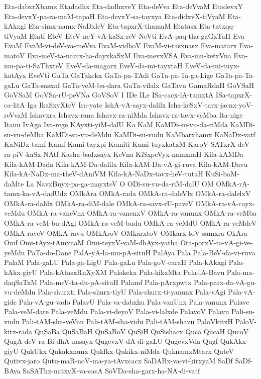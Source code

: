 {Eta-dabxrXbamx
Etadadhx
Eta-dadhxveY
Eta-deVva
Eta-deVvaM
EtadevxY
Eta-devxY-pa-ra-maM-tapaH
Eta-devxY-sa-tayxya
Eta-didxvX-tiVyaM
Eta-kAkxgi
Eta-simx-namx-NaDxleV
Eta-tapxrX-thamaM
Etatasx
Eta-tatxqq-tiVyaM
Etatf
EteV
EteV-neY-vA-kaSx-reV-NeVti
EvA-paq-tha-gaGxTaH
Eva
EvaM
EvaM-vi-deV-va-meVva
EvaM-vidhoV
EvaM-vi-tasxnasx
Eva-matarx
Eva-matoV
Eva-meV-ta-namx-ha-dayxkaSxM
Eva-mevxVSA
Eva-mu-ketxVna
Eva-mu-pa-ti-SaThxteV
EveV-da-magarx
EveV-da-mi-tayxtaH
EveV-da-mi-tuyx-katAyx
EveVti
GaTa
GaTakekx
GaTa-pa-TAdi
GaTa-pa-Ta-ga-Lige
GaTa-pa-Ta-gaLu
GaTa-sasxnf
GaTa-veM-bu-dara
GaTa-vilalx
GaTavu
GamaRdaH
GoVSaH
GoVSaM
GoVSa-rU-peVNa
GoVSoV
I
IDe
ILe
ISa-cacx-lA-tamxtA
ISa-tapxrX-ca-litA
Iga
IkaSxyXteV
Ira-yate
IshA-vA-sayx-dalilx
Isha-keSxV-tarx-jacnx-yoV-reVvaM
Ishavxra
Ishavx-rana
Ishavx-ra-niMda
Ishavx-ra-tavx-veMba
Ita-nige
Itanu
IvAga
Iva-rege
KAyxti-yiM-dalU
Ka
KaM
KaMDi-su-vu-da-riMda
KaMDi-su-vu-deMba
KaMDi-su-vu-deMdu
KaMDi-su-vudu
KaMbarxhamx
KaNaDx-vatf
KaNiDx-tamf
Kamf
Kami-tayxpi
Kamiti
Kami-tuyxkatxM
KaroV-SATxrX-deV-ra-piV-kaSx-NAtf
Kasha-badxsayx
KeVna
KiSxpeVyx-namxnaH
Kila-kAMDa
Kila-kAM-Dada
Kila-kAM-Da-dalilx
Kila-kAM-Da-vA-gi-ruva
Kila-kAM-Davu
Kila-kA-NaDx-ma-theV-dAniVM
Kila-kA-NaDx-tavx-heV-tutaH
KuSi-baM-daMte
La
NavxBuyx-pa-ga-mayxteV
O
ODi-su-vu-da-riM-dalU
OM
OMkA-rA-tamx-ka-vA-dadUdx
OMkAra
OMkA-rada
OMkA-ra-daleVlx
OMkA-ra-dalelxV
OMkA-ra-dalilx
OMkA-ra-diM-dale
OMkA-ra-savx-rU-paveV
OMkA-ra-vA-cayx-veMdu
OMkA-ra-vaneVnx
OMkA-ra-vanenxV
OMkA-ra-vanunx
OMkA-ra-veMba
OMkA-ra-veM-bu-dAgi
OMkA-ra-veM-budu
OMkA-ra-veMdU
OMkA-ra-veMdeV
OMkA-raveV
OMkA-ravu
OMkAroV
OMkarxtoV
OMkarx-toV-samxra
OkAra
Omf
Omi-tAyx-tAmxnaM
Omi-teyxV-vaM-dhAyx-yatha
Ota-porxV-ta-vA-gi-ve-yeMdu
PaTa-do-Dane
PalA-yA-la-mu-pA-situH
PalAya
Pala
Pala-BeV-da-vi-ruva
PalaM
Pala-gaLU
Pala-ga-LigU
Pala-gaLu
Pala-goV-caraH
Pala-kAkxgi
Pala-kAkx-giyU
Pala-kAtasxRnXyXM
Palakekx
Pala-kikxMta
Pala-lA-Bavu
Pala-ma-daqSaTxM
Pala-meV-ta-du-pA-situH
Palamf
Pala-pArxpwtx
Pala-parx-da-vA-gu-vu-deMdu
Pala-shurxti
Pala-shurx-tiyU
Pala-shurx-ti-yanunx
Pala-vAgi
Pala-vA-gide
Pala-vA-gu-vado
PalavU
Pala-va-dabxhu
Pala-vanUnx
Pala-vanunx
Palave
Pala-veM-dare
Pala-veMdu
Pala-vi-deyoV
Pala-vi-lalxde
PalavoV
Palavu
Pali-su-vudu
Pali-tAM-sha-veVnu
Pali-tAM-sha-vidu
Pali-tAM-shavu
PaloVkitxH
PaloV-kitx-rada
QuSaBa
QuSaBaH
QuSaBoV
QuSiH
QuSishacx
Quca
QucaH
QucoV
QugA-deV-ra-Bi-dhA-nasayx
QugevxV-dA-di-gaLU
QugevxVda
Qugf
QukAkx-giyU
QukUkx
Qukakxnunx
Qukfkx
Qukikx-niMda
QuknamxMtarx
QuteV
Qutivx-jaro
Qutu-maR-noV-ma-ya-tAvxcacx
SaDABx-va-vi-kirxyaM
SaDf
SaDf-BAva
SaSAThx-natxyX-va-casA
SoVDa-sha-garx-ha-NA-di-vatf
}
